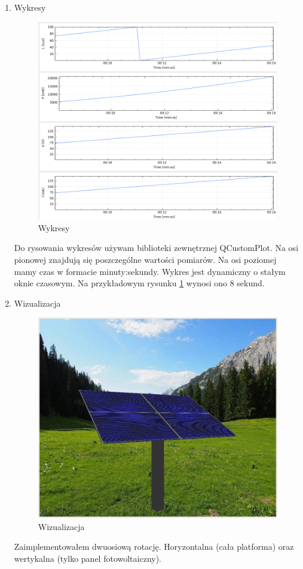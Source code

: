 \documentclass[10pt, a4paper]{article}
\begin{document}
\begin{enumerate}
			\item Wykresy
				\begin{figure}[H]
					\centering
					\includegraphics[width=1.0\textwidth]{figures/wykresy.png}
					\caption{Wykresy}
					\label{fig:wykresy}
				\end{figure}
			Do rysowania wykresów używam biblioteki zewnętrznej QCustomPlot. Na osi pionowej znajdują się poszczególne wartości pomiarów. Na osi poziomej mamy czas w formacie minuty:sekundy. Wykres jest dynamiczny o stałym oknie czasowym. Na przykładowym rysunku \ref{fig:wykresy} wynosi ono 8 sekund.
			\newpage
			\item Wizualizacja
				\begin{figure}[H]
					\centering
					\includegraphics[width=1.0\textwidth]{figures/wizualizacja.png}
					\caption{Wizualizacja}
					\label{fig:wizualizacja}
				\end{figure}
			Zaimplementowałem dwuosiową rotację. Horyzontalna (cała platforma) oraz wertykalna (tylko panel fotowoltaiczny).
		\end{enumerate}
\end{document}
